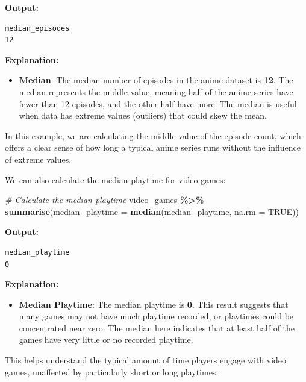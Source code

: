\documentclass[
]{book}
\newenvironment{Shaded}{\begin{snugshade}}{\end{snugshade}}
\newcommand{\AttributeTok}[1]{\textcolor[rgb]{0.13,0.29,0.53}{#1}}
\newcommand{\CommentTok}[1]{\textcolor[rgb]{0.56,0.35,0.01}{\textit{#1}}}
\newcommand{\ConstantTok}[1]{\textcolor[rgb]{0.56,0.35,0.01}{#1}}
\newcommand{\FunctionTok}[1]{\textcolor[rgb]{0.13,0.29,0.53}{\textbf{#1}}}
\newcommand{\NormalTok}[1]{#1}
\newcommand{\SpecialCharTok}[1]{\textcolor[rgb]{0.81,0.36,0.00}{\textbf{#1}}}
\providecommand{\tightlist}{%
  \setlength{\itemsep}{0pt}\setlength{\parskip}{0pt}}
\begin{document}
\textbf{Output:}

\begin{verbatim}
median_episodes
12
\end{verbatim}

\textbf{Explanation:}

\begin{itemize}
\tightlist
\item
  \textbf{Median}: The median number of episodes in the anime dataset is \textbf{12}. The median represents the middle value, meaning half of the anime series have fewer than 12 episodes, and the other half have more. The median is useful when data has extreme values (outliers) that could skew the mean.
\end{itemize}

In this example, we are calculating the middle value of the episode count, which offers a clear sense of how long a typical anime series runs without the influence of extreme values.

We can also calculate the median playtime for video games:

\begin{Shaded}
\begin{Highlighting}[]
\CommentTok{\# Calculate the median playtime}
\NormalTok{video\_games }\SpecialCharTok{\%\textgreater{}\%}
  \FunctionTok{summarise}\NormalTok{(}\AttributeTok{median\_playtime =} \FunctionTok{median}\NormalTok{(median\_playtime, }\AttributeTok{na.rm =} \ConstantTok{TRUE}\NormalTok{))}
\end{Highlighting}
\end{Shaded}

\textbf{Output:}

\begin{verbatim}
median_playtime
0
\end{verbatim}

\textbf{Explanation:}

\begin{itemize}
\tightlist
\item
  \textbf{Median Playtime}: The median playtime is \textbf{0}. This result suggests that many games may not have much playtime recorded, or playtimes could be concentrated near zero. The median here indicates that at least half of the games have very little or no recorded playtime.
\end{itemize}

This helps understand the typical amount of time players engage with video games, unaffected by particularly short or long playtimes.
\end{document}

